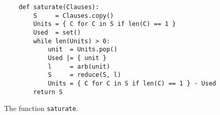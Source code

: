 \begin{figure}[!ht]
  \centering
\begin{verbatim}
    def saturate(Clauses):
        S     = Clauses.copy()
        Units = { C for C in S if len(C) == 1 }
        Used  = set()
        while len(Units) > 0:
            unit  = Units.pop()
            Used |= { unit }
            l     = arb(unit)
            S     = reduce(S, l)
            Units = { C for C in S if len(C) == 1 } - Used        
        return S
\end{verbatim}
\vspace*{-0.3cm}
  \caption{The function \texttt{saturate}. }
  \label{fig:saturate}
\end{figure} 
